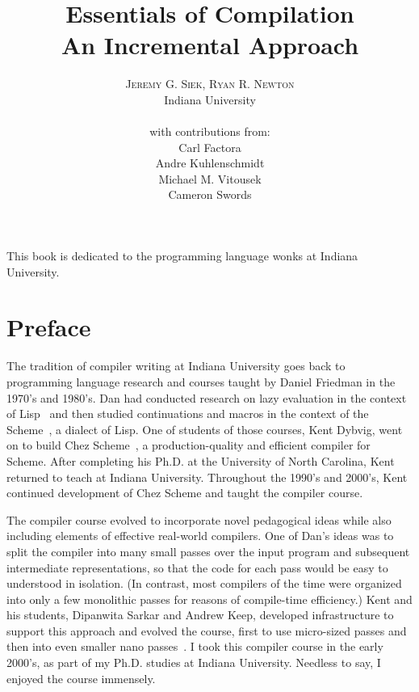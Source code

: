 \documentclass[11pt]{book}
\title{\Huge \textbf{Essentials of Compilation} \\
  \huge An Incremental Approach}
\author{\textsc{Jeremy G. Siek, Ryan R. Newton} \\
  Indiana University \\
  \\
  with contributions from: \\
  Carl Factora \\
  Andre Kuhlenschmidt \\
  Michael M. Vitousek \\
  Cameron Swords
   }
\newcommand{\rn}[1]{{\color{comment-red}{(RRN: #1)}}}
\newcommand{\rn}[1]{}
\newenvironment{dedication}
{
   \cleardoublepage
   \thispagestyle{empty}
   \vspace*{\stretch{1}}
   \hfill\begin{minipage}[t]{0.66\textwidth}
   \raggedright
}
{
   \end{minipage}
   \vspace*{\stretch{3}}
   \clearpage
}
\begin{document}
\frontmatter
\maketitle

\begin{dedication}
This book is dedicated to the programming language wonks at Indiana
University.
\end{dedication}

\tableofcontents
\listoffigures

\mainmatter

\chapter*{Preface}

The tradition of compiler writing at Indiana University goes back to
programming language research and courses taught by Daniel Friedman in
the 1970's and 1980's. Dan had conducted research on lazy evaluation
in the context of Lisp~\citep{McCarthy:1960dz} and then studied
continuations and macros in the context of the
Scheme~\citep{Sussman:1975ab}, a dialect of Lisp.  One of students of
those courses, Kent Dybvig, went on to build Chez
Scheme~\citep{Dybvig:2006aa}, a production-quality and efficient
compiler for Scheme. After completing his Ph.D. at the University of
North Carolina, Kent returned to teach at Indiana University.
Throughout the 1990's and 2000's, Kent continued development of
Chez Scheme and taught the compiler course.

The compiler course evolved to incorporate novel pedagogical ideas
while also including elements of effective real-world compilers.  One
of Dan's ideas was to split the compiler into many small passes over
the input program and subsequent intermediate representations, so that
the code for each pass would be easy to understood in isolation.  (In
contrast, most compilers of the time were organized into only a few
monolithic passes for reasons of compile-time efficiency.)  Kent and
his students, Dipanwita Sarkar and Andrew Keep, developed
infrastructure to support this approach and evolved the course, first
to use micro-sized passes and then into even smaller nano
passes~\citep{Sarkar:2004fk,Keep:2012aa}. I took this compiler course
in the early 2000's, as part of my Ph.D. studies at Indiana
University. Needless to say, I enjoyed the course immensely.

\rn{I think that 1999 when I took it was the first micropass semester, and that
  that approach preceded the infrastructure work by Dipa.}
\end{document}
